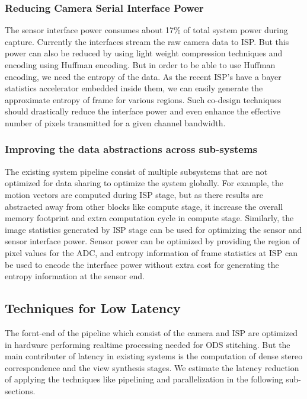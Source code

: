 \subsubsection{Reducing Camera Serial Interface Power}
The sensor interface power consumes about 17\% of total system power during capture. Currently the interfaces stream the raw camera data to ISP. But this power can also be reduced by using light weight compression techniques and encoding using Huffman encoding. But in order to be able to use Huffman encoding, we need the entropy of the data. As the recent ISP's have a bayer statistics accelerator embedded inside them, we can easily generate the approximate entropy of frame for various regions. Such co-design techniques should drastically reduce the interface power and even enhance the effective number of pixels transmitted for a given channel bandwidth. 

\subsubsection{Improving the data abstractions across sub-systems}
The existing system pipeline consist of multiple subsystems that are not optimized for data sharing to optimize the system globally. For example, the motion vectors are computed during ISP stage, but as there results are abstracted away from  other blocks like compute stage, it increase the overall memory footprint and extra computation cycle in compute stage. Similarly, the image statistics generated by ISP stage can be used for optimizing the sensor and sensor interface power. Sensor power can be optimized by providing the region of pixel values for the ADC, and entropy information of frame statistics at ISP can be used to encode the interface power without extra cost for generating the entropy information at the sensor end. 

\subsection{Techniques for Low Latency}

The fornt-end of the pipeline which consist of the camera and ISP are optimized in hardware performing realtime processing needed for ODS stitching. But the main contributer of latency in existing systems is the computation of dense stereo correspondence and the view synthesis stages. We estimate the latency reduction of applying the techniques like pipelining and parallelization in the following sub-sections.
